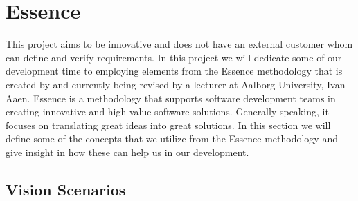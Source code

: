 
\section{Essence}
\label{sec:essence}

This project aims to be innovative and does not have an external customer whom can define and verify requirements. In this project we will dedicate some of our development time to employing elements from the Essence methodology that is created by and currently being revised by a lecturer at Aalborg University, Ivan Aaen. Essence is a methodology that supports software development teams in creating innovative and high value software solutions. Generally speaking, it focuses on translating great ideas into great solutions. In this section we will define some of the concepts that we utilize from the Essence methodology and give insight in how these can help us in our development.





\subsection{Vision Scenarios}
\label{sub:essence_vision_scenarios}


